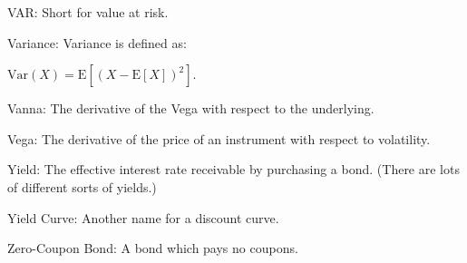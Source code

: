 VAR: Short for value at risk.

Variance: Variance is defined as:

$\text{Var}(X) = \text{E}[(X-\text{E}[X])^2]$.

Vanna: The derivative of the Vega with respect to the underlying.

Vega: The derivative of the price of an instrument with respect to volatility.

Yield: The effective interest rate receivable by purchasing a bond. (There are lots of different sorts of yields.)

Yield Curve: Another name for a discount curve.

Zero-Coupon Bond: A bond which pays no coupons.